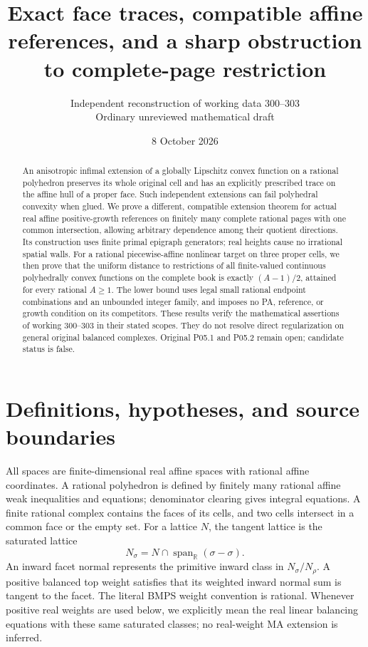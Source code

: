 \documentclass[11pt]{article}
\title{Exact face traces, compatible affine references, and a sharp obstruction to complete-page restriction}
\author{Independent reconstruction of working data 300--303\\Ordinary unreviewed mathematical draft}
\date{8 October 2026}
\theoremstyle{definition}\newtheorem{definition}[theorem]{Definition}
\theoremstyle{remark}\newtheorem{remark}[theorem]{Remark}
\newcommand{\R}{\mathbb R}\newcommand{\Q}{\mathbb Q}
\begin{document}
\maketitle
\begin{abstract}
An anisotropic infimal extension of a globally Lipschitz convex function on a rational polyhedron preserves its whole original cell and has an explicitly prescribed trace on the affine hull of a proper face. Such independent extensions can fail polyhedral convexity when glued. We prove a different, compatible extension theorem for actual real affine positive-growth references on finitely many complete rational pages with one common intersection, allowing arbitrary dependence among their quotient directions. Its construction uses finite primal epigraph generators; real heights cause no irrational spatial walls. For a rational piecewise-affine nonlinear target on three proper cells, we then prove that the uniform distance to restrictions of all finite-valued continuous polyhedrally convex functions on the complete book is exactly $(A-1)/2$, attained for every rational $A\geq1$. The lower bound uses legal small rational endpoint combinations and an unbounded integer family, and imposes no PA, reference, or growth condition on its competitors. These results verify the mathematical assertions of working 300--303 in their stated scopes. They do not resolve direct regularization on general original balanced complexes. Original P05.1 and P05.2 remain open; candidate status is false.
\end{abstract}

\section{Definitions, hypotheses, and source boundaries}
All spaces are finite-dimensional real affine spaces with rational affine coordinates. A rational polyhedron is defined by finitely many rational affine weak inequalities and equations; denominator clearing gives integral equations. A finite rational complex contains the faces of its cells, and two cells intersect in a common face or the empty set. For a lattice $N$, the tangent lattice is the saturated lattice
\[
 N_\sigma=N\cap\operatorname{span}_{\R}(\sigma-\sigma).
\]
An inward facet normal represents the primitive inward class in $N_\sigma/N_\rho$. A positive balanced top weight satisfies that its weighted inward normal sum is tangent to the facet. The literal BMPS weight convention is rational. Whenever positive real weights are used below, we explicitly mean the real linear balancing equations with these same saturated classes; no real-weight MA extension is inferred.
\end{document}

